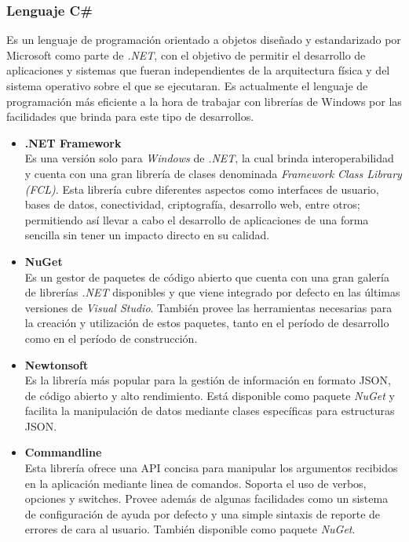        \subsubsection{Lenguaje C\#}
            Es un lenguaje de programación orientado a objetos diseñado y estandarizado por Microsoft como parte de \textit{.NET}, con el objetivo de permitir el desarrollo de aplicaciones y sistemas que fueran independientes de la arquitectura física y del sistema operativo sobre el que se ejecutaran. Es actualmente el lenguaje de programación más eficiente a la hora de trabajar con librerías de Windows por las facilidades que brinda para este tipo de desarrollos. \cite{csharp}

            \begin{itemize}
                \item \textbf{.NET Framework} \\
                Es una versión solo para \textit{Windows} de \textit{.NET}, la cual brinda interoperabilidad y cuenta con una gran librería de clases denominada \textit{Framework Class Library (FCL)}. Esta librería cubre diferentes aspectos como interfaces de usuario, bases de datos, conectividad, criptografía, desarrollo web, entre otros; permitiendo así llevar a cabo el desarrollo de aplicaciones de una forma sencilla sin tener un impacto directo en su calidad. \cite{netframework}
                
                \item \textbf{NuGet} \\
                Es un gestor de paquetes de código abierto que cuenta con una gran galería de librerías \textit{.NET} disponibles y que viene integrado por defecto en las últimas versiones de \textit{Visual Studio}. También provee las herramientas necesarias para la creación y utilización de estos paquetes, tanto en el período de desarrollo como en el período de construcción. \cite{nuget1} \cite{nuget2}

                \item \textbf{Newtonsoft} \\
                    Es la librería más popular para la gestión de información en formato JSON, de código abierto y alto rendimiento. Está disponible como paquete \textit{NuGet} y facilita la manipulación de datos mediante clases específicas para estructuras JSON. \cite{newtonsoft}

                \item \textbf{Commandline} \\
                    Esta librería ofrece una API concisa para manipular los argumentos recibidos en la aplicación mediante linea de comandos. Soporta el uso de verbos, opciones y switches. Provee además de algunas facilidades como un sistema de configuración de ayuda por defecto y una simple sintaxis de reporte de errores de cara al usuario. También disponible como paquete \textit{NuGet}. \cite{commandline1} \cite{commandline2}
                    

\end{itemize}
